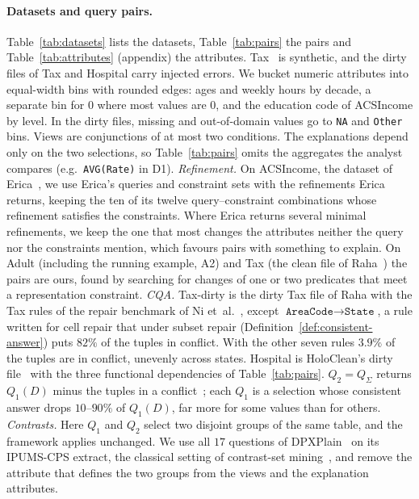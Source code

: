 \paragraph{Datasets and query pairs.}
Table~\ref{tab:datasets} lists the datasets, Table~\ref{tab:pairs} the pairs and Table~\ref{tab:attributes} (appendix) the attributes.
Tax~\cite{BohannonFGJK07} is synthetic, and the dirty files of Tax and Hospital carry injected errors.
We bucket numeric attributes into equal-width bins with rounded edges: ages and weekly hours by decade, a separate bin for $0$ where most values are $0$, and the education code of ACSIncome by level.
In the dirty files, missing and out-of-domain values go to \texttt{NA} and \texttt{Other} bins.
Views are conjunctions of at most two conditions.
The explanations depend only on the two selections, so Table~\ref{tab:pairs} omits the aggregates the analyst compares (e.g.\ \texttt{AVG(Rate)} in D1).
\emph{Refinement.}
On ACSIncome, the dataset of Erica~\cite{LMSJ23,ERICA}, we use Erica's queries and constraint sets with the refinements Erica returns, keeping the ten of its twelve query--constraint combinations whose refinement satisfies the constraints.
Where Erica returns several minimal refinements, we keep the one that most changes the attributes neither the query nor the constraints mention, which favours pairs with something to explain.
On Adult (including the running example, A2) and Tax (the clean file of Raha~\cite{MahdaviAFMOST19}) the pairs are ours, found by searching for changes of one or two predicates that meet a representation constraint.
\emph{CQA.}
Tax-dirty is the dirty Tax file of Raha with the Tax rules of the repair benchmark of Ni et~al.~\cite{NiMZWLY24}, except $\texttt{AreaCode}\to\texttt{State}$, a rule written for cell repair that under subset repair (Definition~\ref{def:consistent-answer}) puts $82\%$ of the tuples in conflict.
With the other seven rules $3.9\%$ of the tuples are in conflict, unevenly across states.
Hospital is HoloClean's dirty file~\cite{rekatsinas2017} with the three functional dependencies of Table~\ref{tab:pairs}.
$Q_2=Q_\Sigma$ returns $Q_1(D)$ minus the tuples in a conflict~\cite{chomicki2004}; each $Q_1$ is a selection whose consistent answer drops $10$--$90\%$ of $Q_1(D)$, far more for some values than for others.
\emph{Contrasts.}
Here $Q_1$ and $Q_2$ select two disjoint groups of the same table, and the framework applies unchanged.
We use all $17$ questions of DPXPlain~\cite{TaoGMR22} on its IPUMS-CPS extract, the classical setting of contrast-set mining~\cite{BayPazzani01,DongLi99}, and remove the attribute that defines the two groups from the views and the explanation attributes.

